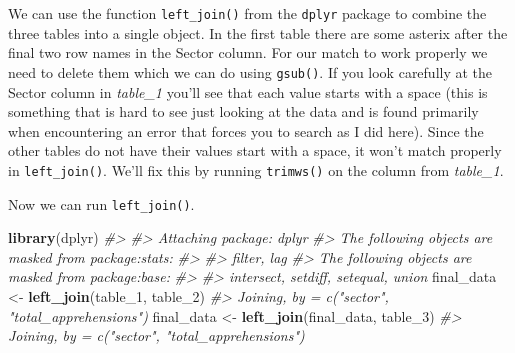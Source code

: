 \documentclass[
  12pt,
]{book}
\newenvironment{Shaded}{\begin{snugshade}}{\end{snugshade}}
\newcommand{\CharTok}[1]{\textcolor[rgb]{0.31,0.60,0.02}{#1}}
\newcommand{\CommentTok}[1]{\textcolor[rgb]{0.56,0.35,0.01}{\textit{#1}}}
\newcommand{\DecValTok}[1]{\textcolor[rgb]{0.00,0.00,0.81}{#1}}
\newcommand{\KeywordTok}[1]{\textcolor[rgb]{0.13,0.29,0.53}{\textbf{#1}}}
\newcommand{\NormalTok}[1]{#1}
\newcommand{\OperatorTok}[1]{\textcolor[rgb]{0.81,0.36,0.00}{\textbf{#1}}}
\newcommand{\StringTok}[1]{\textcolor[rgb]{0.31,0.60,0.02}{#1}}
\begin{document}
We can use the function \texttt{left\_join()} from the \texttt{dplyr} package to combine the three tables into a single object. In the first table there are some asterix after the final two row names in the Sector column. For our match to work properly we need to delete them which we can do using \texttt{gsub()}. If you look carefully at the Sector column in \emph{table\_1} you'll see that each value starts with a space (this is something that is hard to see just looking at the data and is found primarily when encountering an error that forces you to search as I did here). Since the other tables do not have their values start with a space, it won't match properly in \texttt{left\_join()}. We'll fix this by running \texttt{trimws()} on the column from \emph{table\_1}.

\begin{Shaded}
\end{Shaded}

Now we can run \texttt{left\_join()}.

\begin{Shaded}
\begin{Highlighting}[]
\KeywordTok{library}\NormalTok{(dplyr)}
\CommentTok{\#> }
\CommentTok{\#> Attaching package: \textquotesingle{}dplyr\textquotesingle{}}
\CommentTok{\#> The following objects are masked from \textquotesingle{}package:stats\textquotesingle{}:}
\CommentTok{\#> }
\CommentTok{\#>     filter, lag}
\CommentTok{\#> The following objects are masked from \textquotesingle{}package:base\textquotesingle{}:}
\CommentTok{\#> }
\CommentTok{\#>     intersect, setdiff, setequal, union}
\NormalTok{final\_data <{-}}\StringTok{ }\KeywordTok{left\_join}\NormalTok{(table\_}\DecValTok{1}\NormalTok{, table\_}\DecValTok{2}\NormalTok{)}
\CommentTok{\#> Joining, by = c("sector", "total\_apprehensions")}
\NormalTok{final\_data <{-}}\StringTok{ }\KeywordTok{left\_join}\NormalTok{(final\_data, table\_}\DecValTok{3}\NormalTok{)}
\CommentTok{\#> Joining, by = c("sector", "total\_apprehensions")}
\end{Highlighting}
\end{Shaded}
\end{document}
